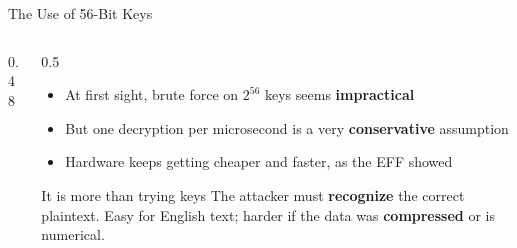 \documentclass[aspectratio=169,11pt,xcolor={table}]{beamer}
\begin{document}
\begin{frame}{The Use of 56-Bit Keys}
  \begin{columns}[c]
    \begin{column}{0.48\textwidth}
      \centering
    \end{column}
    \begin{column}{0.5\textwidth}
      \begin{itemize}\small\setlength{\itemsep}{4pt}
        \item At first sight, brute force on $2^{56}$ keys seems \textbf{impractical}
        \item But one decryption per microsecond is a very \textbf{conservative} assumption
        \item Hardware keeps getting cheaper and faster, as the EFF showed
      \end{itemize}
      \begin{alertblock}{It is more than trying keys}
        \small The attacker must \textbf{recognize} the correct plaintext. Easy for English text; harder if the data was \textbf{compressed} or is numerical.
      \end{alertblock}
    \end{column}
  \end{columns}
\end{frame}
\end{document}
